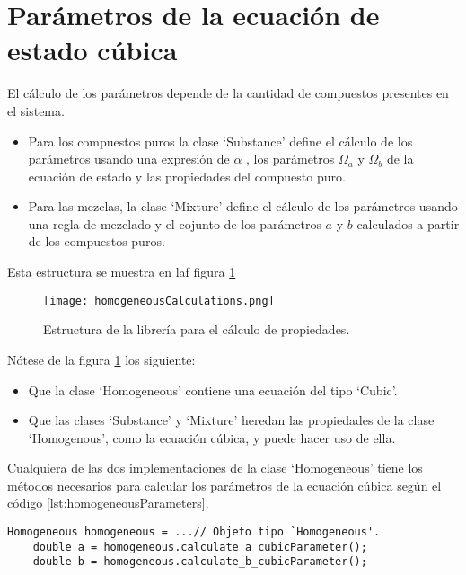 \section{Parámetros de la ecuación de estado cúbica}\label{sec:parameters}

El cálculo de los parámetros depende de la cantidad de compuestos presentes en el sistema.

\begin{itemize}\itemsep0ex
 \item Para los compuestos puros la clase `Substance' define el cálculo de los parámetros usando una expresión de $\alpha$ , los parámetros $\Omega_a$ y $\Omega_b$ de la ecuación de estado y las propiedades del compuesto puro.
 \item Para las mezclas, la clase `Mixture' define el cálculo de los parámetros usando una regla de mezclado y el cojunto de los parámetros  $a$ y $b$ calculados a partir de los compuestos puros.
\end{itemize}


Esta estructura se muestra en laf figura \ref{fig:homogeneousCalculations}

\begin{figure}[!h]
  
  \centering
    \texttt{[image: homogeneousCalculations.png]}
    \caption{Estructura de la librería para el cálculo de propiedades.}
    \label{fig:homogeneousCalculations}
\end{figure}

Nótese de la figura \ref{fig:homogeneousCalculations} los siguiente:
\begin{itemize}\itemsep0ex
	\item Que la clase `Homogeneous' contiene una ecuación del tipo `Cubic'.
 	\item Que las clases `Substance' y `Mixture' heredan las propiedades de la clase `Homogenous', como la ecuación cúbica, y puede hacer uso de ella.

\end{itemize}

	Cualquiera de las dos implementaciones de la clase `Homogeneous' tiene los métodos necesarios para calcular los parámetros de la ecuación cúbica según el código \ref{lst:homogeneousParameters}.

\begin{lstlisting}[caption=Cualquier objeto tipo `Homogeneous' puede calcular los parámetros de la ecuación de estado cúbica a y b, label={lst:homogeneousParameters}]
	Homogeneous homogeneous = ...// Objeto tipo `Homogeneous'.
	double a = homogeneous.calculate_a_cubicParameter();
	double b = homogeneous.calculate_b_cubicParameter();
\end{lstlisting}


